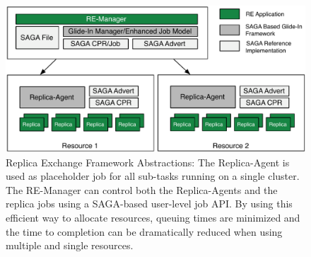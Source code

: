 \documentclass{llncs}
\begin{document}
\begin{figure}[htbp]
    \centering
        \includegraphics[width=4.5in]{remdmanager_v11.pdf}
        \caption{Replica Exchange Framework Abstractions: The
          Replica-Agent is used as placeholder job for all sub-tasks
          running on a single cluster. The RE-Manager can control both
          the Replica-Agents and the replica jobs using a SAGA-based
          user-level job API. By using this efficient way to allocate
          resources, queuing times are minimized and the time to
          completion can be dramatically reduced when using multiple
          and single resources. \up}
    \label{fig:remdmanager_v11}
\end{figure}  

\end{document}
